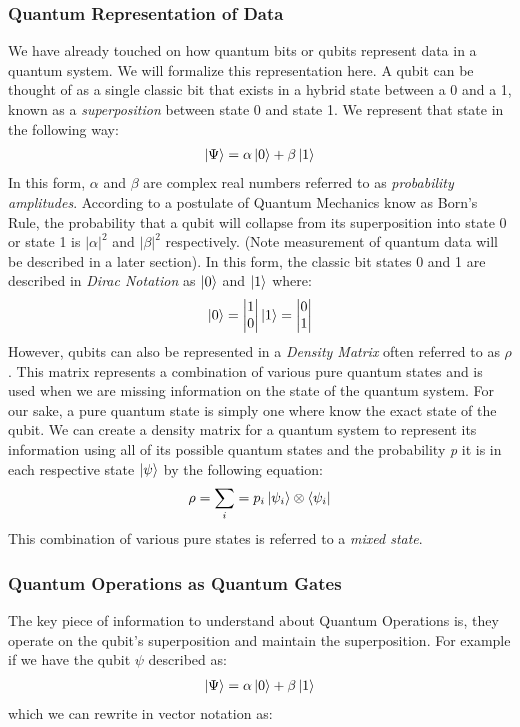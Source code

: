 \documentclass[conference]{IEEEtran}
\begin{document}
\subsubsection{Quantum Representation of Data}
We have already touched on how quantum bits or qubits represent data in a quantum system. We will formalize this representation here. A qubit can be thought of as a single classic bit that exists in a hybrid state between a 0 and a 1, known as a \emph{superposition} between state 0 and state 1. We represent that state in the following way:
\begin{align*}
\ket{\Psi} = \alpha\ket{0} + \beta\ket{1}
\end{align*}
In this form, $\alpha$ and $\beta$ are complex real numbers referred to as \emph{probability amplitudes}. According to a postulate of Quantum Mechanics know as Born's Rule, the probability that a qubit will collapse from its superposition into state 0 or state 1 is $|\alpha|^2$ and $|\beta|^2$ respectively. (Note measurement of quantum data will be described in a later section). In this form, the classic bit states 0 and 1 are described in \emph{Dirac Notation} as $\ket{0}$ and $\ket{1}$ where:
\begin{align*}
\ket{0}=\begin{vmatrix}
1\\
0\\
\end{vmatrix}
\ket{1}=\begin{vmatrix}
0\\
1\\
\end{vmatrix}
\end{align*}
\indent However, qubits can also be represented in a \emph{Density Matrix} often referred to as $\rho$. This matrix represents a combination of various pure quantum states and is used when we are missing information on the state of the quantum system. For our sake, a pure quantum state is simply one where know the exact state of the qubit. We can create a density matrix for a quantum system to represent its information using all of its possible quantum states and the probability \emph{p} it is in each respective state \emph{$\ket{\psi}$} by the following equation: 
\begin{align*}
\rho = \sum_{i}  = p_i \ket{\psi_i} \otimes \bra{\psi_i}
\end{align*}
This combination of various pure states is referred to a \emph{mixed state}.\cite{b9}
\subsubsection{Quantum Operations as Quantum Gates}
The key piece of information to understand about Quantum Operations is, they operate on the qubit's superposition and maintain the superposition. For example if we have the qubit $\psi$ described as:
\begin{align*}
\ket{\Psi} = \alpha\ket{0} + \beta\ket{1}
\end{align*}
which we can rewrite in vector notation as:
\end{document}
